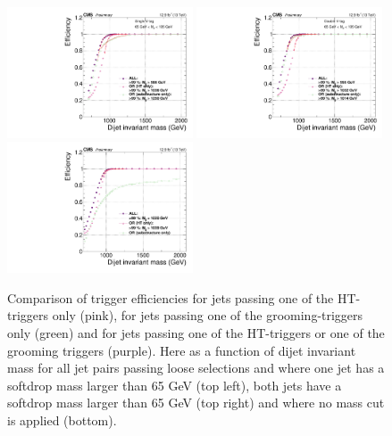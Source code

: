\begin{figure}[h!]
\centering
\includegraphics[width=0.49\textwidth]{figures/analysis/search2/AN-16-235/plots/triggereffMjj-ALL_SingleTag.pdf}
\includegraphics[width=0.49\textwidth]{figures/analysis/search2/AN-16-235/plots/triggereffMjj-ALL_DoubleTag.pdf}\\
\includegraphics[width=0.49\textwidth]{figures/analysis/search2/AN-16-235/plots/triggereffMjj-ALL_noTag.pdf}
\caption{Comparison of trigger efficiencies for jets passing one of the HT-triggers only (pink), for jets passing one of the grooming-triggers only (green) and for jets passing one of the HT-triggers or one of the grooming triggers (purple). Here as a function of dijet invariant mass for all jet pairs passing loose selections and where one jet has a softdrop mass larger than 65 GeV (top left), both jets have a softdrop mass larger than 65 GeV (top right) and where no mass cut is applied (bottom). }
\label{fig:searchII:trigger-fits}
\end{figure}

